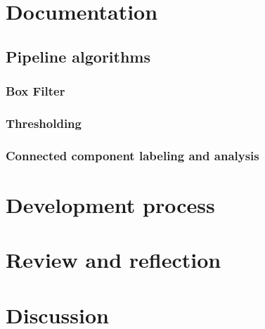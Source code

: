 \documentclass[12pt]{report}
\begin{document}
\chapter{Documentation}

\section{Pipeline algorithms}
\subsection{Box Filter}
\subsection{Thresholding}
\subsection{Connected component labeling and analysis}

\chapter{Development process}

\chapter{Review and reflection}

\chapter{Discussion}




\end{document}
